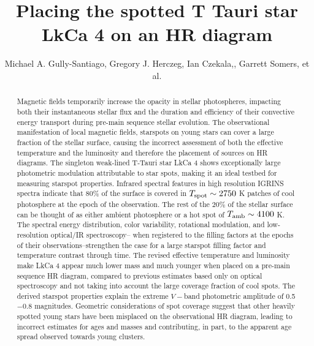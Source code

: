 \documentclass[twocolumn]{emulateapj}%
\begin{document}
 
\title{Placing the spotted T Tauri star LkCa 4 on an HR diagram}

\author{Michael A. Gully-Santiago, Gregory J. Herczeg, Ian Czekala,, Garrett Somers, et al.}



\begin{abstract}
Magnetic fields temporarily increase the opacity in stellar photospheres, impacting both their instantaneous stellar flux and the duration and efficiency of their convective energy transport during pre-main sequence stellar evolution.  The observational manifestation of local magnetic fields, starspots on young stars can cover a large fraction of the stellar surface, causing the incorrect assessment of both the effective temperature and the luminosity and therefore the placement of sources on HR diagrams.  The singleton weak-lined T-Tauri star LkCa 4 shows exceptionally large photometric modulation attributable to star spots, making it an ideal testbed for measuring starspot properties.  Infrared spectral features in high resolution IGRINS spectra indicate that 80\% of the surface is covered in $T_\textrm{spot} \sim 2750$ K patches of cool photosphere at the epoch of the observation.  The rest of the $20\%$ of the stellar surface can be thought of as either ambient photosphere or a hot spot of $T_\textrm{amb} \sim4100$ K.  The spectral energy distribution, color variability, rotational modulation, and low-resolution optical/IR spectroscopy-- when registered to the filling factors at the epochs of their observations--strengthen the case for a large starspot filling factor and temperature contrast through time.  The revised effective temperature and luminosity make LkCa 4 appear much lower mass and much younger when placed on a pre-main sequence HR diagram, compared to previous estimates based only on optical spectroscopy and not taking into account the large coverage fraction of cool spots.  The derived starspot properties explain the extreme $V-$band photometric amplitude of 0.5$-$0.8 magnitudes.  Geometric considerations of spot coverage suggest that other heavily spotted young stars have been misplaced on the observational HR diagram, leading to incorrect estimates for ages and masses and contributing, in part, to the apparent age spread observed towards young clusters.
\end{abstract}

\end{document}
